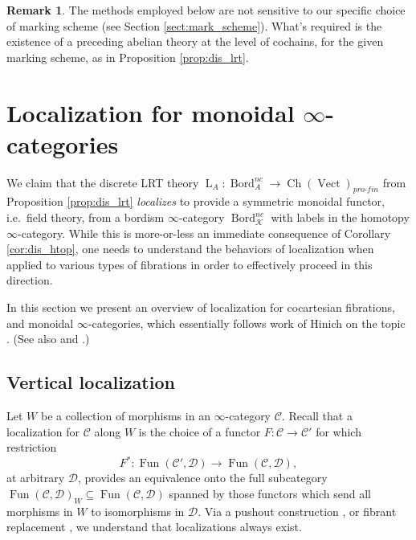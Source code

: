 \documentclass[reqno]{amsart}
\theoremstyle{definition}
\newtheorem{remark}[lemma]{Remark}
\newcommand{\msc}[1]{\mathscr{#1}}
\newcommand{\opn}[1]{\operatorname{#1}}
\newcommand{\pf}{pro\text{-}fin}
\DeclareMathOperator{\Fun}{Fun}
\DeclareMathOperator{\Bord}{Bord}
\renewcommand{\1}{\mathbf{1}}
\begin{document}
\begin{remark}
The methods employed below are not sensitive to our specific choice of marking scheme (see Section \ref{sect:mark_scheme}). What's required is the existence of a preceding abelian theory at the level of cochains, for the given marking scheme, as in Proposition \ref{prop:dis_lrt}.
\end{remark}

\section{Localization for monoidal $\infty$-categories}
\label{sect:localization}

We claim that the discrete LRT theory $\opn{L}_A:\Bord^{nc}_A\to \opn{Ch}(\opn{Vect})_{\pf}$ from Proposition \ref{prop:dis_lrt} \emph{localizes} to provide a symmetric monoidal functor, i.e.\ field theory, from a bordism $\infty$-category $\Bord^{nc}_{\msc{K}}$ with labels in the homotopy $\infty$-category. While this is more-or-less an immediate consequence of Corollary \ref{cor:dis_htop}, one needs to understand the behaviors of localization when applied to various types of fibrations in order to effectively proceed in this direction.
\par

In this section we present an overview of localization for cocartesian fibrations, and monoidal $\infty$-categories, which essentially follows work of Hinich on the topic \cite{hinich16}. (See also \cite[Propositions 2.2.1.9 \& 4.1.7.4]{ha} and \cite[Appendix A]{nikolausscholze18}.)

\subsection{Vertical localization}
\label{sect:vert_loc}

Let $W$ be a collection of morphisms in an $\infty$-category $\msc{C}$. Recall that a localization for $\msc{C}$ along $W$ is the choice of a functor $F:\msc{C}\to \msc{C}'$ for which restriction
\[
F^{\ast}:\Fun(\msc{C}',\msc{D})\to \Fun(\msc{C},\msc{D}),
\]
at arbitrary $\msc{D}$, provides an equivalence onto the full subcategory $\Fun(\msc{C},\msc{D})_W\subseteq \Fun(\msc{C},\msc{D})$ spanned by those functors which send all morphisms in $W$ to isomorphisms in $\msc{D}$.  Via a pushout construction \cite[\href{https://kerodon.net/tag/05ZL}{05ZL}]{kerodon}, or fibrant replacement \cite[Proposition 3.1.3.7]{lurie09}, we understand that localizations always exist.
\end{document}
